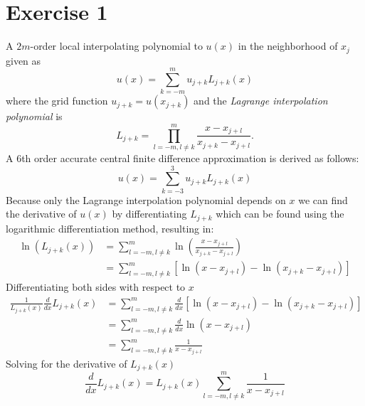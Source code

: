 \section{Exercise 1}
A $2m$-order local interpolating polynomial to $u(x)$ in the neighborhood of $x_j$ given as
\begin{equation}
	u(x) = \sum_{k=-m}^m u_{j+k} L_{j+k}(x)
	\label{eq:interp_poly}
\end{equation}
where the grid function $u_{j+k} = u(x_{j+k})$ and the \textit{Lagrange interpolation polynomial} is
\begin{equation}
	L_{j+k} = \prod_{l=-m, l \neq k}^m \frac{x - x_{j+l}}{x_{j+k} - x_{j+l}}.
	\label{eq:lagrange_interpoly}
\end{equation}
A 6th order accurate central finite difference approximation is derived as follows:
\begin{equation}
	u(x) = \sum_{k=-3}^3 u_{j+k} L_{j+k}(x)
	\label{eq:6order}
\end{equation}
Because only the Lagrange interpolation polynomial depends on $x$ we can find the derivative of $u(x)$ by differentiating $L_{j+k}$ which can be found using the logarithmic differentiation method, resulting in:
\begin{equation}
	\begin{aligned}
		\ln(L_{j+k}(x)) & = \sum_{l=-m, l \neq k}^m \ln\left(\frac{x - x_{j+l}}{x_{j+k} - x_{j+l}}\right)  \\
		                & = \sum_{l=-m, l \neq k}^m \left[\ln(x - x_{j+l}) - \ln(x_{j+k} - x_{j+l})\right]
	\end{aligned}
\end{equation}
Differentiating both sides with respect to $x$
\begin{equation}
	\begin{aligned}
		\frac{1}{L_{j+k}(x)}\frac{d}{dx}L_{j+k}(x) & = \sum_{l=-m, l \neq k}^m \frac{d}{dx}\left[\ln(x - x_{j+l}) - \ln(x_{j+k} - x_{j+l})\right] \\
		                                           & = \sum_{l=-m, l \neq k}^m \frac{d}{dx}\ln(x - x_{j+l})                                       \\
		                                           & = \sum_{l=-m, l \neq k}^m \frac{1}{x - x_{j+l}}
	\end{aligned}
\end{equation}
Solving for the derivative of $L_{j+k}(x)$
\begin{equation}
	\frac{d}{dx}L_{j+k}(x)  = L_{j+k}(x) \sum_{l=-m, l \neq k}^m \frac{1}{x - x_{j+l}}
\end{equation}
